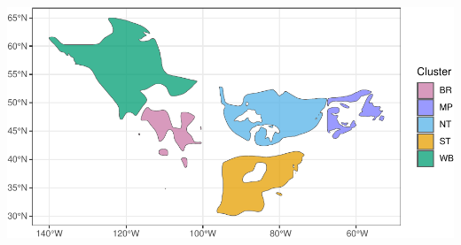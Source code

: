 \documentclass[
]{book}
\begin{document}
\includegraphics[width=0.7\linewidth]{Mignette_files/figure-latex/unnamed-chunk-27-1}

  
\end{document}
